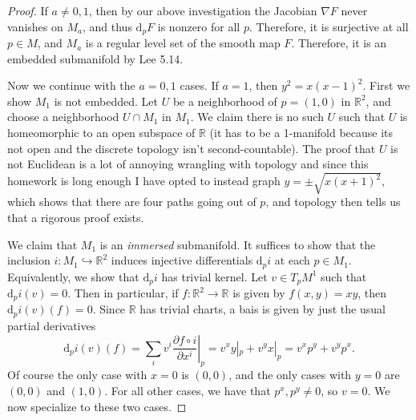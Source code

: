 \documentclass[11pt, letterpaper]{article}
\theoremstyle{plain}
\begin{document}
\begin{proof}
	If $a\neq 0,1$, then by our above investigation the Jacobian $\nabla F$ never vanishes on $M_a$, and thus $\mathrm{d}_pF$ is nonzero for all $p$. Therefore, it is surjective at all $p\in M$, and $M_a$ is a regular level set of the smooth map $F$. Therefore, it is an embedded submanifold by Lee 5.14.

	Now we continue with the $a=0,1$ cases. If $a=1$, then $y^2=x(x-1)^2$. First we show $M_1$ is not embedded. Let $U$ be a neighborhood of $p=(1,0)$ in $\mathbb{R} ^2$, and choose a neighborhood $U \cap M_1$ in $M_1$. We claim there is no such $U$ such that $U$ is homeomorphic to an open subspace of $\mathbb{R} $ (it has to be a 1-manifold because its not open and the discrete topology isn't second-countable). The proof that $U$ is not Euclidean is a lot of annoying wrangling with topology and since this homework is long enough I have opted to instead graph $y=\pm \sqrt{x(x+1)^2} $, which shows that there are four paths going out of $p$, and topology then tells us that a rigorous proof exists.


We claim that $M_1$ is an \emph{immersed} submanifold. It suffices to show that the inclusion $i:M_1\hookrightarrow \mathbb{R} ^2$ induces injective differentials $\mathrm{d}_p i$ at each $p\in M_1$. Equivalently, we show that $\mathrm{d}_p i$ has trivial kernel. Let $v\in T_pM^1$ such that $\mathrm{d}_p i(v)=0$. Then in particular, if $f : \mathbb{R} ^2 \to \mathbb{R} $ is given by $f(x,y)=xy$, then $\mathrm{d}_p i(v)(f)=0$. Since $\mathbb{R} $ has trivial charts, a bais is given by just the usual partial derivatives
\[
	\mathrm{d}_p i(v)(f)=\sum_{i} v^i \left. \frac{\partial f\circ i}{\partial x^i} \right|_p=v^x y|_p + v^yx|_p=v^xp^y+v^yp^x
.\]
Of course the only case with $x=0$ is $(0,0)$, and the only cases with $y=0$ are $(0,0)$ and $(1,0)$. For all other cases, we have that $p^x,p^y \neq 0$, so $v=0$. We now specialize to these two cases.


\end{proof}
\end{document}
